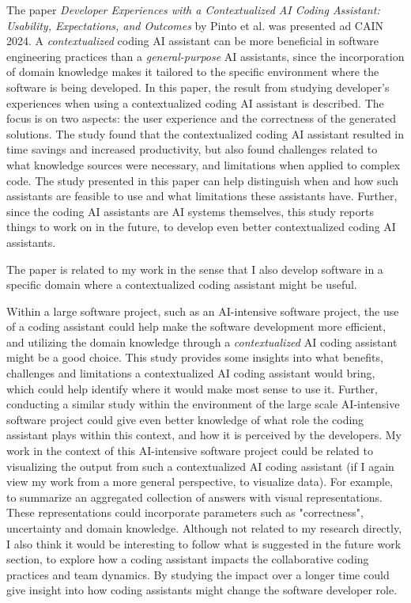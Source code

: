 \documentclass[11pt]{article}
\begin{document}
The paper \textit{Developer Experiences with a Contextualized AI Coding Assistant: Usability, Expectations, and Outcomes} by Pinto et al. \cite{pinto_developer_experience_with_a_contextualized_AI_coding_assistant} was presented ad CAIN 2024. 
A \emph{contextualized} coding AI assistant can be more beneficial in software engineering practices than a \emph{general-purpose} AI assistants, since the incorporation of domain knowledge makes it tailored to the specific environment where the software is being developed.
In this paper, the result from studying developer's experiences when using a contextualized coding AI assistant is described. The focus is on two aspects: the user experience and the correctness of the generated solutions. The study found that the contextualized coding AI assistant resulted in time savings and increased productivity, but also found challenges related to what knowledge sources were necessary, and limitations when applied to complex code.
The study presented in this paper can help distinguish when and how such assistants are feasible to use and what limitations these assistants have.
Further, since the coding AI assistants are AI systems themselves, this study reports things to work on in the future, to develop even better contextualized coding AI assistants.

The paper is related to my work in the sense that I also develop software in a specific domain where a contextualized coding assistant might be useful. 

Within a large software project, such as an AI-intensive software project, the use of a coding assistant could help make the software development more efficient, and utilizing the domain knowledge through a \emph{contextualized} AI coding assistant might be a good choice.
This study provides some insights into what benefits, challenges and limitations a contextualized AI coding assistant would bring, which could help identify where it would make most sense to use it. Further, conducting a similar study within the environment of the large scale AI-intensive software project could give even better knowledge of what role the coding assistant plays within this context, and how it is perceived by the developers.
My work in the context of this AI-intensive software project could be related to visualizing the output from such a contextualized AI coding assistant (if I again view my work from a more general perspective, to visualize data). 
For example, to summarize an aggregated collection of answers with visual representations. These representations could incorporate parameters such as "correctness", uncertainty and domain knowledge.
Although not related to my research directly, I also think it would be interesting to follow what is suggested in the future work section, to explore how a coding assistant impacts the collaborative coding practices and team dynamics. 
By studying the impact over a longer time could give insight into how coding assistants might change the software developer role.
\end{document}
